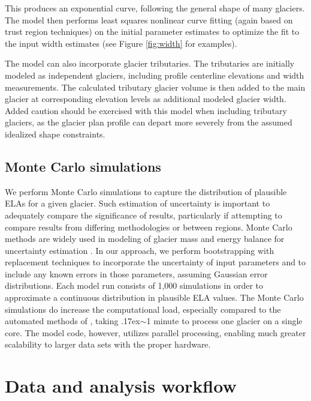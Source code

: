 \documentclass[review]{elsarticle}
\newcommand{\mytilde}{\raise.17ex\hbox{$\scriptstyle\mathtt{\sim}$}}
\begin{document}
This produces an exponential curve, following the general shape of many glaciers.
The model then performs least squares nonlinear curve fitting (again based on trust region techniques) on the initial parameter estimates to optimize the fit to the input width estimates (see Figure \ref{fig:width} for examples).

The model can also incorporate glacier tributaries.
The tributaries are initially modeled as independent glaciers, including profile centerline elevations and width measurements.
The calculated tributary glacier volume is then added to the main glacier at corresponding elevation levels as additional modeled glacier width.
Added caution should be exercised with this model when including tributary glaciers, as the glacier plan profile can depart more severely from the assumed idealized shape constraints.

\subsection{Monte Carlo simulations}

We perform Monte Carlo simulations to capture the distribution of plausible ELAs for a given glacier.
Such estimation of uncertainty is important to adequately compare the significance of results, particularly if attempting to compare results from differing methodologies or between regions.
Monte Carlo methods are widely used in modeling of glacier mass and energy balance for uncertainty estimation \cite{machguth_exploring_2008}.
In our approach, we perform bootstrapping with replacement techniques to incorporate the uncertainty of input parameters and to include any known errors in those parameters, assuming Gaussian error distributions.
Each model run consists of 1,000 simulations in order to approximate a continuous distribution in plausible ELA values.
The Monte Carlo simulations do increase the computational load, especially compared to the automated methods of \cite{benn_exceltm_2010, pellitero_gis_2015}, taking \mytilde1 minute to process one glacier on a single core.
The model code, however, utilizes parallel processing, enabling much greater scalability to larger data sets with the proper hardware.

\section{Data and analysis workflow}
\end{document}
